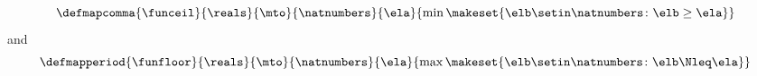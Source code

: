 {\begin{forslides}
        \begin{equation}\label{eq:funceil-scalar}
            \defmapcomma{
                \funceil
            }{
                \reals
            }{
                \mto
            }{
                \natnumbers
            }{
                \ela
            }{
                \min \makeset{\elb \setin \natnumbers \colon \elb \geq \ela }
            }
        \end{equation}
        and
        \begin{equation}\label{eq:funfloor-scalar}
            \defmapperiod{
                \funfloor
            }{
                \reals
            }{
                \mto
            }{
                \natnumbers
            }{
                \ela
            }{
                \max \makeset{\elb \setin \natnumbers \colon \elb \Nleq \ela }
            }
        \end{equation}

    \end{forslides}

}